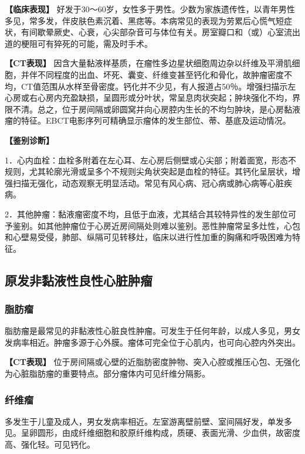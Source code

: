 \textbf{【临床表现】}
好发于30～60岁，女性多于男性。少数为家族遗传性，以青年男性多见，常多发，伴皮肤色素沉着、黑痣等。本病常见的表现为劳累后心慌气短症状，有间歇晕厥史、心衰，心尖部杂音可与体位有关。房室瓣口和（或）心室流出道的梗阻可有猝死的可能，需及时手术。

\textbf{【CT表现】}
因含大量黏液样基质，在瘤性多边星状细胞周边杂以纤维及平滑肌细胞，并伴不同程度的出血、坏死、囊变、纤维变甚至钙化和骨化，故肿瘤密度不均，CT值范围从水样至骨密度。钙化并不少见，有人报道占50％。增强扫描示左心房或右心房内充盈缺损，呈圆形或分叶状，常呈息肉状突起；肿块强化不均，界限不清。总之，位于房间隔或卵圆窝并向心房腔内生长的不均匀肿块，是心房黏液瘤的特征。EBCT电影序列可精确显示瘤体的发生部位、蒂、基底及运动情况。

\textbf{【鉴别诊断】}

1．心内血栓：血栓多附着在左心耳、左心房后侧壁或心尖部；附着面宽，形态不规则，尤其轮廓光滑或呈多个不规则尖角状突起是血栓的特征。其钙化呈层状，增强扫描无强化，动态观察无明显活动。常见有风心病、冠心病或肺心病等心脏疾病。

2．其他肿瘤：黏液瘤密度不均，且低于血液，尤其结合其较特异性的发生部位可予鉴别。如其他肿瘤位于心房近房间隔处则难以鉴别。恶性肿瘤常呈多灶性，心包和心壁易受侵，肺部、纵隔可见转移灶，临床以进行性加重的胸痛和呼吸困难为特征。

\subsection{原发非黏液性良性心脏肿瘤}

\subsubsection{脂肪瘤}

脂肪瘤是最常见的非黏液性心脏良性肿瘤。可发生于任何年龄，以成人多见，男女发病率相近。肿瘤多源于心外膜。瘤体可完全位于心肌内，也可向心腔内外突出。

\textbf{【CT表现】}
位于房间隔或心壁的近脂肪密度肿物、突入心腔或推压心包、无强化为心脏脂肪瘤的重要特点。部分瘤体内可见纤维分隔影。

\subsubsection{纤维瘤}

多发生于儿童及成人，男女发病率相近。左室游离壁前壁、室间隔好发，单发多见。呈卵圆形，由成纤维细胞和胶原纤维构成，质硬、表面光滑、少血供，故密度高、强化轻。可见钙化。

